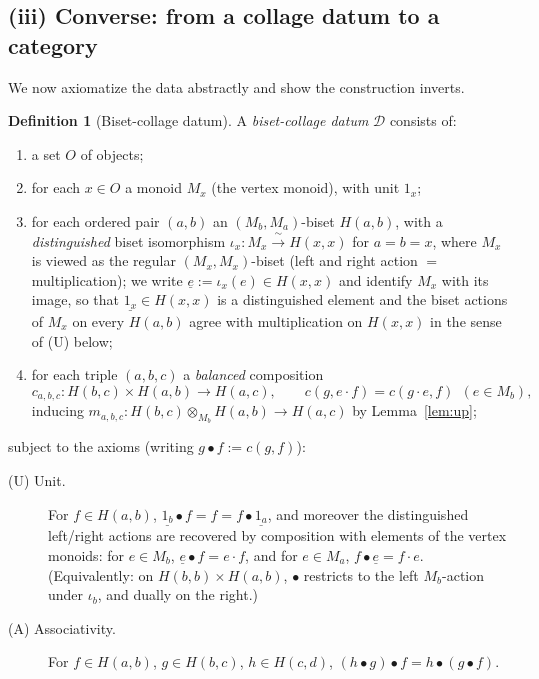 \documentclass[11pt]{article}
\theoremstyle{definition}
\newtheorem{definition}[theorem]{Definition}
\newcommand{\D}{\mathcal{D}}
\begin{document}
\subsection*{(iii) Converse: from a collage datum to a category}

We now axiomatize the data abstractly and show the construction inverts.

\begin{definition}[Biset-collage datum]\label{def:datum}
A \emph{biset-collage datum} $\D$ consists of:
\begin{enumerate}
\item a set $O$ of objects;
\item for each $x\in O$ a monoid $M_x$ (the vertex monoid), with unit $1_x$;
\item for each ordered pair $(a,b)$ an $(M_b,M_a)$-biset $H(a,b)$, with a
\emph{distinguished} biset isomorphism $\iota_x:M_x \xrightarrow{\ \sim\ }
H(x,x)$ for $a=b=x$, where $M_x$ is viewed as the regular $(M_x,M_x)$-biset
(left and right action $=$ multiplication); we write
$\underline e := \iota_x(e)\in H(x,x)$ and identify $M_x$ with its image, so
that $\underline{1_x}\in H(x,x)$ is a distinguished element and the biset
actions of $M_x$ on every $H(a,b)$ agree with multiplication on $H(x,x)$ in
the sense of (U) below;
\item for each triple $(a,b,c)$ a \emph{balanced} composition
\[
  c_{a,b,c} : H(b,c)\times H(a,b)\to H(a,c),
  \qquad c(g,e\cdot f)=c(g\cdot e, f)\ \ (e\in M_b),
\]
inducing $m_{a,b,c}:H(b,c)\otimes_{M_b}H(a,b)\to H(a,c)$ by
Lemma~\ref{lem:up};
\end{enumerate}
subject to the axioms (writing $g\bullet f := c(g,f)$):
\begin{description}
\item[(U) Unit.] For $f\in H(a,b)$,
$\underline{1_b}\bullet f = f = f\bullet\underline{1_a}$, and moreover the
distinguished left/right actions are recovered by composition with elements of
the vertex monoids: for $e\in M_b$, $\underline e\bullet f = e\cdot f$, and for
$e\in M_a$, $f\bullet\underline e = f\cdot e$. (Equivalently: on
$H(b,b)\times H(a,b)$, $\bullet$ restricts to the left $M_b$-action under
$\iota_b$, and dually on the right.)
\item[(A) Associativity.] For $f\in H(a,b)$, $g\in H(b,c)$, $h\in H(c,d)$,
$(h\bullet g)\bullet f = h\bullet(g\bullet f)$.
\end{description}
\end{definition}
\end{document}
